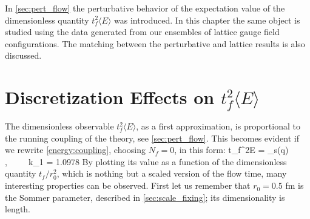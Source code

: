 In \cref{sec:pert_flow} the perturbative behavior of the expectation value of the dimensionless quantity  $t_f^2\langle E \rangle$ was introduced. In this chapter the same object is studied using the data generated from our ensembles of lattice gauge field configurations. The matching between the perturbative and lattice results is also discussed.

\section{Discretization Effects on $t_f^2\langle E \rangle$}
\label{sec:scale}
The dimensionless observable $t_f^2\langle E \rangle$, as a first approximation, is proportional to the running coupling of the theory, see \cref{sec:pert_flow}. This becomes evident if we rewrite \cref{energy:coupling}, choosing $N_f=0$, in this form:
\beq
t_f^2\langle E \rangle =  \alpha_s(q) ,~~~~~k_1 = 1.0978%
\label{eq:t2Ebuona}
\eeq  
By plotting its value  as a function of the dimensionless quantity $t_f/r_0^2$, which is nothing but a scaled version of the flow time, many interesting properties can be observed. First let us remember that $r_0=0.5$ fm is the Sommer parameter, described in \cref{sec:scale_fixing}; its dimensionality is length.


